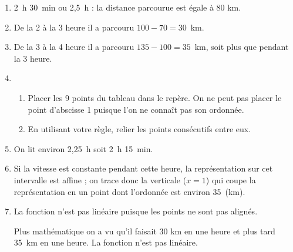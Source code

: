 \documentclass[openany]{book}
\begin{document}
\begin{enumerate}
\item %
2~h 30~min ou 2,5~h : la distance parcourue est égale à 80 km.
\item %
De la 2 à la 3 heure il a parcouru $100 - 70 = 30$~km.
\item %
De la 3 à la 4 heure il a parcouru $135 - 100 = 35$~km, soit plus que pendant la 3 heure.
\item %
	\begin{enumerate}
		\item Placer les 9 points du tableau dans le repère. On ne peut pas placer le
point d'abscisse 1 puisque l'on ne connaît pas son ordonnée.
		\item En utilisant votre règle, relier les points consécutifs entre eux.
 	\end{enumerate}
\item %
On lit environ 2,25~h soit 2~h 15~min.
\item %
Si la vitesse est constante pendant cette heure, la représentation sur cet intervalle est affine ; on trace donc la verticale ($x = 1$) qui coupe la représentation en un point dont l'ordonnée est environ 35~(km).
\item %
La fonction n'est pas linéaire puisque les points ne sont pas alignés.

Plus mathématique on a vu qu'il faisait 30 km en une heure et plus tard 35~km en une heure. La fonction n'est pas linéaire.
\end{enumerate}

\vspace{0,5cm}

\Exe
\end{document}
